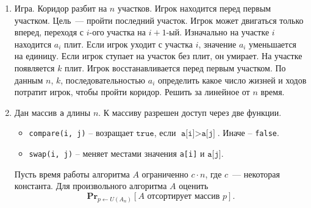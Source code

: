 \begin{enumerate}
  \item Игра. Коридор разбит на $n$ участков. Игрок находится перед первым участком. 
        Цель~--- пройти последний участок.  Игрок может двигаться только вперед, переходя
        с $i$-ого участка на $i+1$-ый.
        Изначально на участке $i$ находится $a_i$ плит. Если игрок уходит с участка $i$, значение
        $a_i$ уменьшается на единицу. Если игрок ступает на участок без плит, он умирает.
        На участке появляется $k$ плит. Игрок восстанавливается перед первым участком.
        По данным $n$, $k$, последовательностью $a_i$ определить какое число жизней и ходов
        потратит игрок, чтобы пройти коридор. Решить за линейное от $n$ время.

  \item Дан массив \texttt{a} длины $n$. К массиву разрешен доступ через две функции.
  \begin{itemize}
      \item \texttt{compare(i, j)} -- возращает $\texttt{true}$, если $\texttt{a[i]} > \texttt{a[j]}$. Иначе -- \texttt{false}.
      \item \texttt{swap(i, j)} -- меняет местами значения \texttt{a[i]} и $\texttt{a[j]}$.
  \end{itemize}
     Пусть время работы алгоритма $A$ ограниченно $c \cdot n$, где $c$~--- некоторая константа.
     Для произвольного алгоритма $A$ оценить 
      $$ 
          \textbf{Pr}_{p \leftarrow U(A_n)} \left[ A \text{ отсортирует массив } p \right].
      $$

\end{enumerate}

